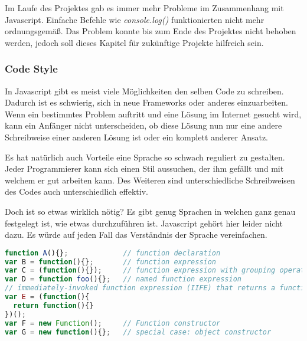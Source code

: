 
Im Laufe des Projektes gab es immer mehr Probleme im Zusammenhang mit Javascript. Einfache Befehle wie \textit{console.log()} funktionierten nicht mehr ordnungsgemäß. Das Problem konnte bis zum Ende des Projektes nicht behoben werden, jedoch soll dieses Kapitel für zukünftige Projekte hilfreich sein.

\subsubsection{Code Style}
In Javascript gibt es meist viele Möglichkeiten den selben Code zu schreiben. Dadurch ist es schwierig, sich in neue Frameworks oder anderes einzuarbeiten. Wenn ein bestimmtes Problem auftritt und eine Lösung im Internet gesucht wird, kann ein Anfänger nicht unterscheiden, ob diese Lösung nun nur eine andere Schreibweise einer anderen Lösung ist oder ein komplett anderer Ansatz. 

Es hat natürlich auch Vorteile eine Sprache so schwach reguliert zu gestalten. Jeder Programmierer kann sich einen Stil aussuchen, der ihm gefällt und mit welchem er gut arbeiten kann. Des Weiteren sind unterschiedliche Schreibweisen des Codes auch unterschiedlich effektiv. 

Doch ist so etwas wirklich nötig? Es gibt genug Sprachen in welchen ganz genau festgelegt ist, wie etwas durchzuführen ist. Javascript gehört hier leider nicht dazu. Es würde auf jeden Fall das Verständnis der Sprache vereinfachen. 

\begin{lstlisting}[caption = Unterschiedliche Möglichkeiten eine Funktion zu deklarieren\cite{JSOP1}, label = jsopfn, language=Javascript]
function A(){};             // function declaration
var B = function(){};       // function expression
var C = (function(){});     // function expression with grouping operators
var D = function foo(){};   // named function expression
// immediately-invoked function expression (IIFE) that returns a function
var E = (function(){ 
  return function(){}
})();
var F = new Function();     // Function constructor
var G = new function(){};   // special case: object constructor

\end{lstlisting}

